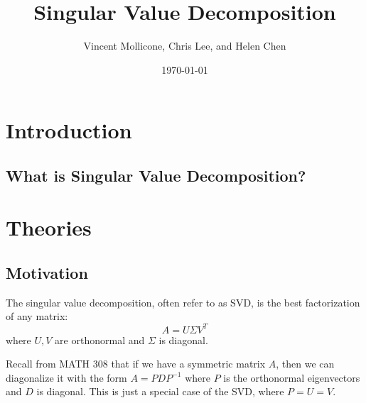 \documentclass{article}
\title{Singular Value Decomposition}
\author{Vincent Mollicone, Chris Lee, and Helen Chen}
\date{\today}
\begin{document}
\maketitle

\section{Introduction}
\subsection{What is Singular Value Decomposition?}


\section{Theories}
\subsection{Motivation}
The singular value decomposition, often refer to as SVD, is the best factorization of any matrix:
$$A = U \Sigma V^T$$
where $U,V$ are orthonormal and $\Sigma$ is diagonal.

Recall from MATH 308 that if we have a symmetric matrix $A$, then we can diagonalize it with the form $A=PDP^{-1}$ where $P$ is the orthonormal eigenvectors and $D$ is diagonal. This is just a special case of the SVD, where $P = U = V$.
\end{document}
